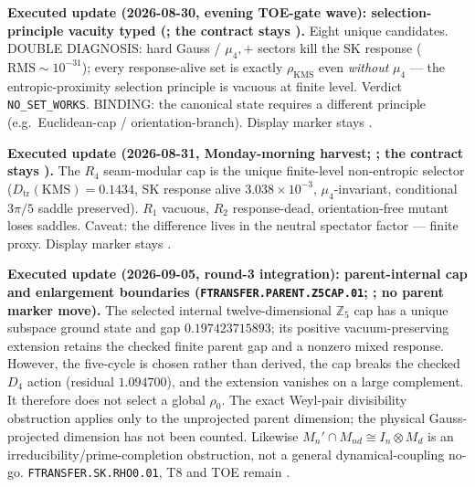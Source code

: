\documentclass[11pt,a4paper]{article}
\begin{document}
\par\smallskip\noindent\textbf{Executed update (2026-08-30, evening TOE-gate wave): selection-principle
vacuity typed
(; the contract stays \mO).}
Eight unique candidates.  DOUBLE DIAGNOSIS: hard Gauss / $\mu_4,+$ sectors kill the SK response
($\mathrm{RMS}\sim10^{-31}$); every response-alive set is exactly $\rho_{\mathrm{KMS}}$ even
\emph{without} $\mu_4$ --- the entropic-proximity selection principle is vacuous at finite level.
Verdict \texttt{NO\_SET\_WORKS}.  BINDING: the canonical state requires a different principle
(e.g.\ Euclidean-cap / orientation-branch).  Display marker stays \mO.

\par\smallskip\noindent\textbf{Executed update (2026-08-31, Monday-morning harvest;
;
the contract stays \mO).}
The $R_4$ seam-modular cap is the unique finite-level non-entropic selector
($D_{\mathrm{tr}}(\mathrm{KMS})=0.1434$, SK response alive $3.038{\times}10^{-3}$,
$\mu_4$-invariant, conditional $3\pi/5$ saddle preserved).  $R_1$ vacuous, $R_2$
response-dead, orientation-free mutant loses saddles.  Caveat: the difference lives
in the neutral spectator factor --- finite proxy.  Display marker stays \mO.

\par\smallskip\noindent\textbf{Executed update (2026-09-05, round-3 integration):
parent-internal cap and enlargement boundaries
(\texttt{FTRANSFER.PARENT.Z5CAP.01};
; no parent
marker move).}
The selected internal twelve-dimensional $\mathbb Z_5$ cap has a unique subspace
ground state and gap $0.197423715893$; its positive vacuum-preserving extension retains
the checked finite parent gap and a nonzero mixed response.  However, the five-cycle is
chosen rather than derived, the cap breaks the checked $D_4$ action (residual
$1.094700$), and the extension vanishes on a large complement.  It therefore does not
select a global $\rho_0$.  The exact Weyl-pair divisibility obstruction applies only to
the unprojected parent dimension; the physical Gauss-projected dimension has not been
counted.  Likewise
$M_n'\cap M_{nd}\cong I_n\otimes M_d$ is an irreducibility/prime-completion obstruction,
not a general dynamical-coupling no-go.  \texttt{FTRANSFER.SK.RHO0.01}, T8 and TOE
remain \mO.

\end{document}

